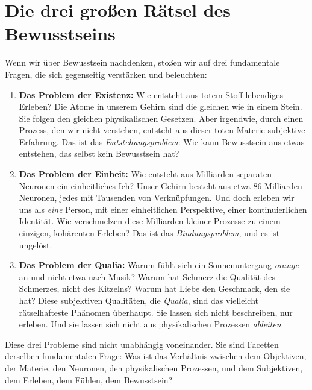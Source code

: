 \section{Die drei großen Rätsel des Bewusstseins}

Wenn wir über Bewusstsein nachdenken, stoßen wir auf drei fundamentale Fragen, die sich gegenseitig verstärken und beleuchten:

\begin{enumerate}
	\item \textbf{Das Problem der Existenz:} Wie entsteht aus totem Stoff lebendiges Erleben? Die Atome in unserem Gehirn sind die gleichen wie in einem Stein. Sie folgen den gleichen physikalischen Gesetzen. Aber irgendwie, durch einen Prozess, den wir nicht verstehen, entsteht aus dieser toten Materie subjektive Erfahrung. Das ist das \emph{Entstehungsproblem}: Wie kann Bewusstsein aus etwas entstehen, das selbst kein Bewusstsein hat?

	\item \textbf{Das Problem der Einheit:} Wie entsteht aus Milliarden separaten Neuronen ein einheitliches Ich? Unser Gehirn besteht aus etwa 86 Milliarden Neuronen, jedes mit Tausenden von Verknüpfungen. Und doch erleben wir uns als \emph{eine} Person, mit einer einheitlichen Perspektive, einer kontinuierlichen Identität. Wie verschmelzen diese Milliarden kleiner Prozesse zu einem einzigen, kohärenten Erleben? Das ist das \emph{Bindungsproblem}, und es ist ungelöst.

	\item \textbf{Das Problem der Qualia:} Warum fühlt sich ein Sonnenuntergang \emph{orange} an und nicht etwa nach Musik? Warum hat Schmerz die Qualität des Schmerzes, nicht des Kitzelns? Warum hat Liebe den Geschmack, den sie hat? Diese subjektiven Qualitäten, die \emph{Qualia}, sind das vielleicht rätselhafteste Phänomen überhaupt. Sie lassen sich nicht beschreiben, nur erleben. Und sie lassen sich nicht aus physikalischen Prozessen \emph{ableiten}.
\end{enumerate}

Diese drei Probleme sind nicht unabhängig voneinander. Sie sind Facetten derselben fundamentalen Frage: Was ist das Verhältnis zwischen dem Objektiven, der Materie, den Neuronen, den physikalischen Prozessen, und dem Subjektiven, dem Erleben, dem Fühlen, dem Bewusstsein?

